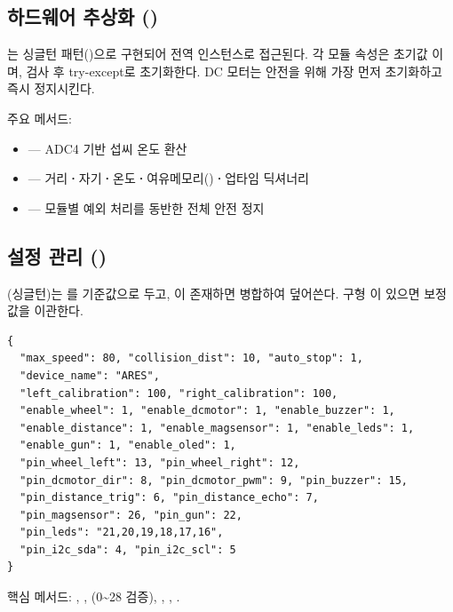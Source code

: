\subsection{하드웨어 추상화 ()}

는 싱글턴 패턴()으로 구현되어 전역
 인스턴스로 접근된다. 각 모듈 속성은 초기값 이며,
 검사 후 try-except로 초기화한다.
DC 모터는 안전을 위해 가장 먼저 초기화하고 즉시 정지시킨다.

주요 메서드:
\begin{itemize}
  \item {} --- ADC4 기반 섭씨 온도 환산
  \item {} --- 거리\textbf{·}자기\textbf{·}온도\textbf{·}여유메모리()\textbf{·}업타임 딕셔너리
  \item {} --- 모듈별 예외 처리를 동반한 전체 안전 정지
\end{itemize}

\subsection{설정 관리 ()}

(싱글턴)는 를 기준값으로 두고,
이 존재하면 병합하여 덮어쓴다. 구형 이
있으면 보정값을 이관한다.

\begin{verbatim}
{
  "max_speed": 80, "collision_dist": 10, "auto_stop": 1,
  "device_name": "ARES",
  "left_calibration": 100, "right_calibration": 100,
  "enable_wheel": 1, "enable_dcmotor": 1, "enable_buzzer": 1,
  "enable_distance": 1, "enable_magsensor": 1, "enable_leds": 1,
  "enable_gun": 1, "enable_oled": 1,
  "pin_wheel_left": 13, "pin_wheel_right": 12,
  "pin_dcmotor_dir": 8, "pin_dcmotor_pwm": 9, "pin_buzzer": 15,
  "pin_distance_trig": 6, "pin_distance_echo": 7,
  "pin_magsensor": 26, "pin_gun": 22,
  "pin_leds": "21,20,19,18,17,16",
  "pin_i2c_sda": 4, "pin_i2c_scl": 5
}
\end{verbatim}

핵심 메서드: , ,
(0\textasciitilde 28 검증), ,
, .

